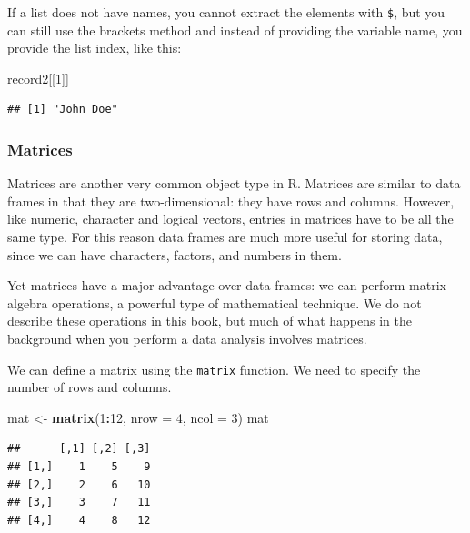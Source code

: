 \documentclass[
]{article}
\newenvironment{Shaded}{\begin{snugshade}}{\end{snugshade}}
\newcommand{\AttributeTok}[1]{\textcolor[rgb]{0.13,0.29,0.53}{#1}}
\newcommand{\DecValTok}[1]{\textcolor[rgb]{0.00,0.00,0.81}{#1}}
\newcommand{\FunctionTok}[1]{\textcolor[rgb]{0.13,0.29,0.53}{\textbf{#1}}}
\newcommand{\NormalTok}[1]{#1}
\newcommand{\OtherTok}[1]{\textcolor[rgb]{0.56,0.35,0.01}{#1}}
\newcommand{\SpecialCharTok}[1]{\textcolor[rgb]{0.81,0.36,0.00}{\textbf{#1}}}
\begin{document}
If a list does not have names, you cannot extract the elements with
\texttt{\$}, but you can still use the brackets method and instead of
providing the variable name, you provide the list index, like this:

\begin{Shaded}
\begin{Highlighting}[]
\NormalTok{record2[[}\DecValTok{1}\NormalTok{]]}
\end{Highlighting}
\end{Shaded}

\begin{verbatim}
## [1] "John Doe"
\end{verbatim}

\subsubsection{Matrices}\label{matrices}

Matrices are another very common object type in R. Matrices are similar
to data frames in that they are two-dimensional: they have rows and
columns. However, like numeric, character and logical vectors, entries
in matrices have to be all the same type. For this reason data frames
are much more useful for storing data, since we can have characters,
factors, and numbers in them.

Yet matrices have a major advantage over data frames: we can perform
matrix algebra operations, a powerful type of mathematical technique. We
do not describe these operations in this book, but much of what happens
in the background when you perform a data analysis involves matrices.

We can define a matrix using the \texttt{matrix} function. We need to
specify the number of rows and columns.

\begin{Shaded}
\begin{Highlighting}[]
\NormalTok{mat }\OtherTok{\textless{}{-}} \FunctionTok{matrix}\NormalTok{(}\DecValTok{1}\SpecialCharTok{:}\DecValTok{12}\NormalTok{, }\AttributeTok{nrow =} \DecValTok{4}\NormalTok{, }\AttributeTok{ncol =} \DecValTok{3}\NormalTok{)}
\NormalTok{mat}
\end{Highlighting}
\end{Shaded}

\begin{verbatim}
##      [,1] [,2] [,3]
## [1,]    1    5    9
## [2,]    2    6   10
## [3,]    3    7   11
## [4,]    4    8   12
\end{verbatim}
\end{document}
